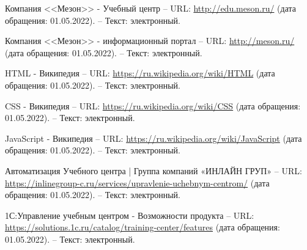 \begingroup
\renewcommand{\section}[2]{\anonsection{Список использованных источников}}
\begin{thebibliography}{00}


    

        Компания <<Мезон>> - Учебный центр
        --
        URL:
        \href{http://edu.meson.ru/}{http://edu.meson.ru/}
        (дата обращения: 01.05.2022).
        --
        Текст: электронный.

        Компания <<Мезон>> - информационный портал
        --
        URL:
        \href{http://meson.ru/}{http://meson.ru/}
        (дата обращения: 01.05.2022).
        --
        Текст: электронный.

        HTML - Википедия
        --
        URL:
        \href{https://ru.wikipedia.org/wiki/HTML}{https://ru.wikipedia.org/wiki/HTML}
        (дата обращения: 01.05.2022).
        --
        Текст: электронный.

        CSS - Википедия
        --
        URL:
        \href{https://ru.wikipedia.org/wiki/CSS}{https://ru.wikipedia.org/wiki/CSS}
        (дата обращения: 01.05.2022).
        --
        Текст: электронный.
    
        JavaScript - Википедия
        --
        URL:
        \href{https://ru.wikipedia.org/wiki/JavaScript}{https://ru.wikipedia.org/wiki/JavaScript}
        (дата обращения: 01.05.2022).
        --
        Текст: электронный.

        Автоматизация Учебного центра | Группа компаний «ИНЛАЙН ГРУП»
        --
        URL:
        \href{https://inlinegroup-c.ru/services/upravlenie-uchebnym-centrom/}{https://inlinegroup-c.ru/services/upravlenie-uchebnym-centrom/}
        (дата обращения: 01.05.2022).
        --
        Текст: электронный.

        1С:Управление учебным центром - Возможности продукта
        --
        URL:
        \href{https://solutions.1c.ru/catalog/training-center/features}{https://solutions.1c.ru/catalog/training-center/features}
        (дата обращения: 01.05.2022).
        --
        Текст: электронный.


\end{thebibliography}
